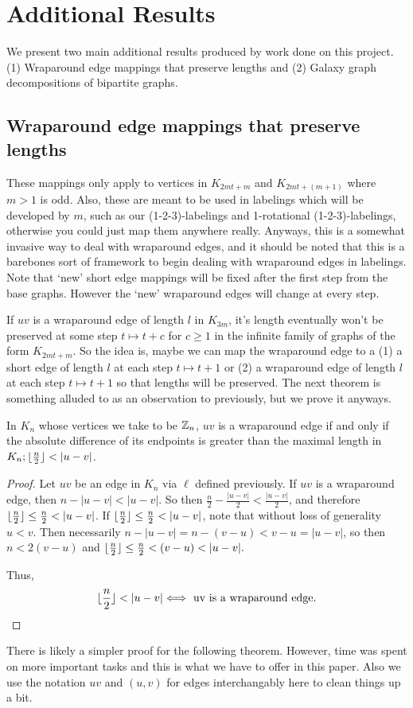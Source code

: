 \chapter{Additional Results} \label{chap:Additional Results}

We present two main additional results produced by work done on this project. (1) Wraparound edge mappings that preserve lengths and (2) Galaxy graph decompositions of bipartite graphs.

\section{Wraparound edge mappings that preserve lengths}

These mappings only apply to vertices in $K_{2mt+m}$ and $K_{2mt+(m+1)}$ where $m>1$ is odd. Also, these are meant to be used in labelings which will be developed by $m$, such as our (1-2-3)-labelings and 1-rotational (1-2-3)-labelings, otherwise you could just map them anywhere really. Anyways, this is a somewhat invasive way to deal with wraparound edges, and it should be noted that this is a barebones sort of framework to begin dealing with wraparound edges in labelings. Note that `new' short edge mappings will be fixed after the first step from the base graphs. However the `new' wraparound edges will change at every step.

If $uv$ is a wraparound edge of length $l$ in $K_{3m}$, it's length eventually won't be preserved at some step $t\mapsto t+c$ for $c\geq 1$ in the infinite family of graphs of the form $K_{2mt+m}$. So the idea is, maybe we can map the wraparound edge to a (1) a short edge of length $l$ at each step $t\mapsto t+1$ or (2) a wraparound edge of length $l$ at each step $t\mapsto t+1$ so that lengths will be preserved. The next theorem is something alluded to as an observation to previously, but we prove it anyways.\newpage
\begin{thm} \label{thm:wraplarger}
    In $K_{n}$ whose vertices we take to be $\mathbb{Z}_{n}$, $uv$ is a wraparound edge if and only if the absolute difference of its endpoints is greater than the maximal length in $K_{n};\floor{\frac{n}{2}}<|u-v|$. 
    \begin{proof}
        Let $uv$ be an edge in $K_{n}$ via $\ell$ defined previously. If $uv$ is a wraparound edge, then $n-|u-v|<|u-v|$. So then $\frac{n}{2}-\frac{|u-v|}{2}<\frac{|u-v|}{2}$, and therefore $\floor{\frac{n}{2}}\leq \frac{n}{2}<|u-v|$. If $\floor{\frac{n}{2}}\leq \frac{n}{2}<|u-v|$, note that without loss of generality $u<v$. Then necessarily $n-|u-v|=n-(v-u)<v-u=|u-v|$, so then $n<2(v-u)$ and $\floor{\frac{n}{2}}\leq\frac{n}{2}<(v-u)<|u-v|.$
    
        Thus,
        $$\floor{\frac{n}{2}}<|u-v|\Longleftrightarrow\text{ uv is a wraparound edge.}$$
    \end{proof}
    \end{thm}
There is likely a simpler proof for the following theorem. However, time was spent on more important tasks and this is what we have to offer in this paper. Also we use the notation $uv$ and $(u,v)$ for edges interchangably here to clean things up a bit.

